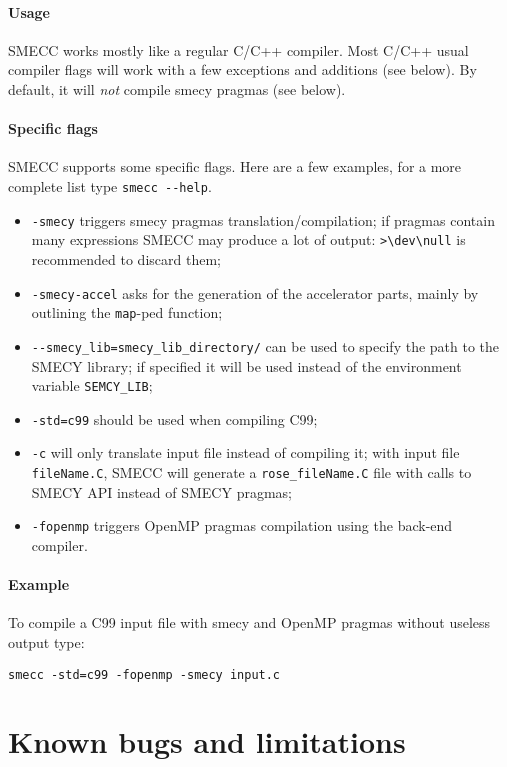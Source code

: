 \documentclass[a4paper,11pt]{article}
\newcommand{\scompiler}{SMECC }
\begin{document}
		\paragraph{Usage}
		\scompiler works mostly like a regular C/C++ compiler. Most C/C++ usual compiler flags will work with a few exceptions and additions (see below). By default, it will \emph{not} compile smecy pragmas (see below).

		\paragraph{Specific flags}
		\scompiler supports some specific flags. Here are a few examples, for a more complete list type \verb+smecc --help+.
		\begin{itemize}
        \item \verb+-smecy+ triggers smecy pragmas
          translation/compilation; if pragmas contain many expressions
          \scompiler may produce a lot of output: \verb+>\dev\null+ is
          recommended to discard them;
			\item \verb+-smecy-accel+ asks for the generation of the
              accelerator parts, mainly by outlining the \texttt{map}-ped
              function;
			\item \verb+--smecy_lib=smecy_lib_directory/+ can be used to specify the path to the SMECY library; if specified it will be used instead of the environment variable \verb+SEMCY_LIB+;
			\item \verb+-std=c99+ should be used when compiling C99;
			\item \verb+-c+ will only translate input file instead of compiling it; with input file \verb+fileName.C+, \scompiler will generate a \verb+rose_fileName.C+ file with calls to SMECY API instead of SMECY pragmas;
			\item \verb+-fopenmp+ triggers OpenMP pragmas compilation using the back-end compiler.
		\end{itemize}

		\paragraph{Example} To compile a C99 input file with smecy and OpenMP pragmas without useless output type:
\begin{verbatim}
smecc -std=c99 -fopenmp -smecy input.c
\end{verbatim}

	\section{Known bugs and limitations}
\end{document}
